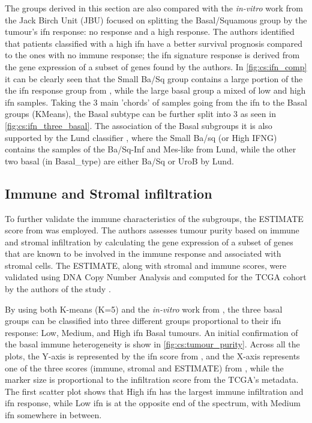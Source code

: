 The groups derived in this section are also compared with the \textit{in-vitro} work \citet{Baker2022-bj} from the Jack Birch Unit (JBU) focused on splitting the Basal/Squamous group by the tumour's \acrfull{ifn} response: no response and a high response. The authors identified that patients classified with a high \acrshort{ifn} have a better survival prognosis compared to the ones with no immune response; the \acrshort{ifn} signature response is derived from the gene expression of a subset of genes found by the authors. In \cref{fig:cs:ifn_comp} it can be clearly seen that the Small Ba/Sq group contains a large portion of the the \acrshort{ifn} response group from \citet{Baker2022-bj}, while the large basal group a mixed of low and high \acrshort{ifn} samples. Taking the 3 main 'chords' of samples going from the \acrshort{ifn} to the Basal groups (KMeans), the Basal subtype can be further split into 3 as seen in \cref{fig:cs:ifn_three_basal}. The association of the Basal subgroups it is also supported by the Lund classifier \citet{Marzouka2018-ge}, where the Small Ba/sq (or High IFNG) contains the samples of the Ba/Sq-Inf and Mes-like from Lund, while the other two basal (in Basal\_type) are either Ba/Sq or UroB by Lund.

\subsection{Immune and Stromal infiltration}

To further validate the immune characteristics of the subgroups, the ESTIMATE score from \citet{Yoshihara2013-wq} was employed. The authors assesses tumour purity based on immune and stromal infiltration by calculating the gene expression of a subset of genes that are known to be involved in the immune response and associated with stromal cells. The ESTIMATE, along with stromal and immune scores, were validated using DNA Copy Number Analysis and computed for the TCGA cohort by the authors of the study \citet{Yoshihara2013-wq}.

By using both K-means (K=5) and the \textit{in-vitro} work from \citet{Baker2022-bj}, the three basal groups can be classified into three different groups proportional to their \acrfull{ifn} response: Low, Medium, and High \acrshort{ifn} Basal tumours. An initial confirmation of the basal immune heterogeneity is show in \cref{fig:cs:tumour_purity}. Across all the plots, the Y-axis is represented by the \acrshort{ifn} score from \citet{Baker2022-bj}, and the X-axis represents one of the three scores (immune, stromal and ESTIMATE) from \citet{Yoshihara2013-wq}, while the marker size is proportional to the infiltration score from the TCGA's metadata. The first scatter plot shows that High \acrshort{ifn} has the largest immune infiltration and \acrshort{ifn} response, while Low \acrshort{ifn} is at the opposite end of the spectrum, with Medium \acrshort{ifn} somewhere in between.

